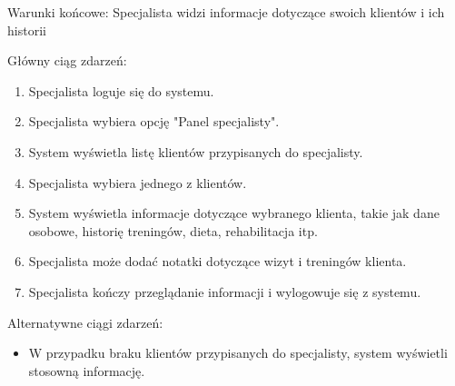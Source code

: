 {Warunki końcowe: Specjalista widzi informacje dotyczące swoich klientów
i ich historii}

{Główny ciąg zdarzeń:}

\begin{enumerate}
\tightlist
\item
  {Specjalista loguje się do systemu.}
\item
  {Specjalista wybiera opcję "Panel specjalisty".}
\item
  {System wyświetla listę klientów przypisanych do specjalisty.}
\item
  {Specjalista wybiera jednego z klientów.}
\item
  {System wyświetla informacje dotyczące wybranego klienta, takie jak
  dane osobowe, historię treningów, dieta, rehabilitacja itp.}
\item
  {Specjalista może dodać notatki dotyczące wizyt i treningów klienta.}
\item
  {Specjalista kończy przeglądanie informacji i wylogowuje się z
  systemu.}
\end{enumerate}

{Alternatywne ciągi zdarzeń:}

\begin{itemize}
\tightlist
\item
  {W przypadku braku klientów przypisanych do specjalisty, system
  wyświetli stosowną informację.}
\end{itemize}